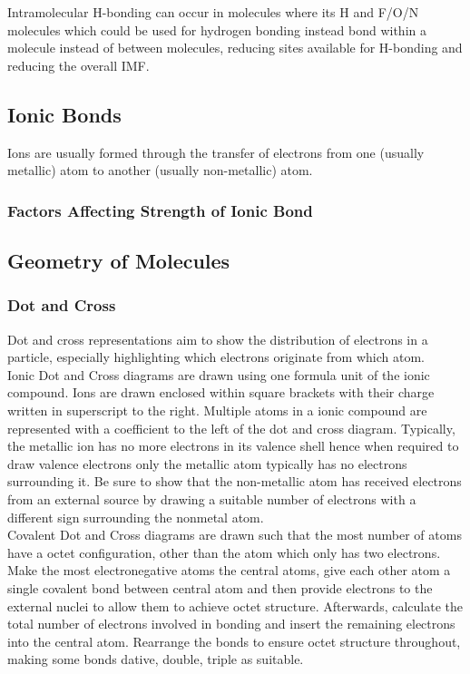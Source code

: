 \documentclass[../main]{subfiles}
\begin{document}
	Intramolecular H-bonding can occur in molecules where its H and F/O/N molecules which could be used for hydrogen bonding instead bond within a molecule instead of between molecules, reducing sites available for H-bonding and reducing the overall IMF.

	\subsection{Ionic Bonds}


	Ions are usually formed through the transfer of electrons from one (usually metallic) atom to another (usually non-metallic) atom.

	\subsubsection{Factors Affecting Strength of Ionic Bond}

	\subsection{Geometry of Molecules}

	\subsubsection{Dot and Cross}

	Dot and cross representations aim to show the distribution of electrons in a particle, especially highlighting which electrons originate from which atom. \\

	Ionic Dot and Cross diagrams are drawn using one formula unit of the ionic compound. Ions are drawn enclosed within square brackets with their charge written in superscript to the right. Multiple atoms in a ionic compound are represented with a coefficient to the left of the dot and cross diagram. Typically, the metallic ion has no more electrons in its valence shell hence when required to draw valence electrons only the metallic atom typically has no electrons surrounding it. Be sure to show that the non-metallic atom has received electrons from an external source by drawing a suitable number of electrons with a different sign surrounding the nonmetal atom. \\

	Covalent Dot and Cross diagrams are drawn such that the most number of atoms have a octet configuration, other than the  atom which only has two electrons. Make the most electronegative atoms the central atoms, give each other atom a single covalent bond between central atom and then provide electrons to the external nuclei to allow them to achieve octet structure. Afterwards, calculate the total number of electrons involved in bonding and insert the remaining electrons into the central atom. Rearrange the bonds to ensure octet structure throughout, making some bonds dative, double, triple as suitable.\\
\end{document}
